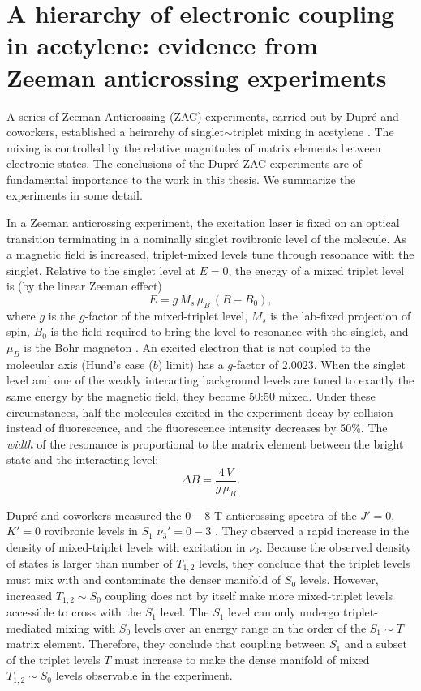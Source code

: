 \documentclass[12pt]{mitthesis}
\begin{document}
\section{A hierarchy of electronic coupling in acetylene: evidence from
  Zeeman anticrossing experiments}

A series of Zeeman Anticrossing (ZAC) experiments, carried out by
Dupr\'{e} and coworkers, established a heirarchy of
singlet$\sim$triplet mixing in acetylene \cite{dupre91, dupre93,
  dupre95a, dupre95b}.  The mixing is controlled by the relative
magnitudes of matrix elements between electronic states.  The
conclusions of the Dupr\'{e} ZAC experiments are of fundamental
importance to the work in this thesis.  We summarize the experiments
in some detail.

In a Zeeman anticrossing experiment, the excitation laser is fixed on
an optical transition terminating in a nominally singlet rovibronic
level of the molecule.  As a magnetic field is increased,
triplet-mixed levels tune through resonance with the singlet.
Relative to the singlet level at $E=0$, the energy of a mixed triplet
level is (by the linear Zeeman effect)
\begin{equation}
  E = g \, M_s \, \mu_B \, (B-B_0),
\end{equation}
where $g$ is the $g$-factor of the mixed-triplet level, $M_s$ is the
lab-fixed projection of spin, $B_0$ is the field required to bring the
level to resonance with the singlet, and $\mu_B$ is the Bohr magneton
\cite{lombardi88}.  An excited electron that is not coupled to the
molecular axis (Hund's case ($b$) limit) has a $g$-factor of $2.0023$.
When the singlet level and one of the weakly interacting background
levels are tuned to exactly the same energy by the magnetic field,
they become 50:50 mixed.  Under these circumstances, half the
molecules excited in the experiment decay by collision instead of
fluorescence, and the fluorescence intensity decreases by 50\%.  The
\emph{width} of the resonance is proportional to the matrix element
between the bright state and the interacting level:
\begin{equation}
  \Delta B = \frac{4\,V}{g\,\mu_B}.
\end{equation}

Dupr\'{e} and coworkers measured the $0-8$ T anticrossing spectra of
the $J'=0$, $K'=0$ rovibronic levels in $S_1$ $\nu_3'=0-3$
\cite{dupre91}.  They observed a rapid increase in the density of
mixed-triplet levels with excitation in $\nu_3$.  Because the observed
density of states is larger than number of $T_{1,2}$ levels, they
conclude that the triplet levels must mix with and contaminate the
denser manifold of $S_0$ levels.  However, increased $T_{1,2} \sim
S_0$ coupling does not by itself make more mixed-triplet levels
accessible to cross with the $S_1$ level.  The $S_1$ level can only
undergo triplet-mediated mixing with $S_0$ levels over an energy range
on the order of the $S_1 \sim T$ matrix element.  Therefore, they
conclude that coupling between $S_1$ and a subset of the triplet
levels $T$ must increase to make the dense manifold of mixed $T_{1,2}
\sim S_0$ levels observable in the experiment.
\end{document}
